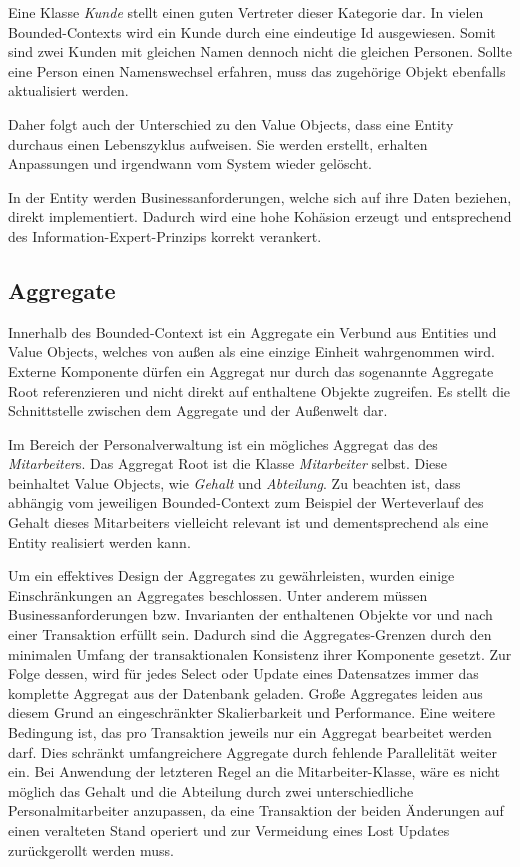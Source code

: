 Eine Klasse \emph{Kunde} stellt einen guten Vertreter dieser Kategorie dar. In vielen Bounded-Contexts wird ein Kunde durch eine eindeutige Id ausgewiesen. Somit sind zwei Kunden mit gleichen Namen dennoch nicht die gleichen Personen. Sollte eine Person einen Namenswechsel erfahren, muss das zugehörige Objekt ebenfalls aktualisiert werden.

Daher folgt auch der Unterschied zu den Value Objects, dass eine Entity durchaus einen Lebenszyklus aufweisen. Sie werden erstellt, erhalten Anpassungen und irgendwann vom System wieder gelöscht.

In der Entity werden Businessanforderungen, welche sich auf ihre Daten beziehen, direkt implementiert. Dadurch wird eine hohe Kohäsion erzeugt und entsprechend des Information-Expert-Prinzips korrekt verankert.


\subsection{Aggregate}

Innerhalb des Bounded-Context ist ein Aggregate ein Verbund aus Entities und Value Objects, welches von außen als eine einzige Einheit wahrgenommen wird. Externe Komponente dürfen ein Aggregat nur durch das sogenannte Aggregate Root referenzieren und nicht direkt auf enthaltene Objekte zugreifen. Es stellt die Schnittstelle zwischen dem Aggregate und der Außenwelt dar. 

Im Bereich der Personalverwaltung ist ein mögliches Aggregat das des \emph{Mitarbeiter}s. Das Aggregat Root ist die Klasse \emph{Mitarbeiter} selbst. Diese beinhaltet Value Objects, wie \emph{Gehalt} und \emph{Abteilung}. Zu beachten ist, dass abhängig vom jeweiligen Bounded-Context zum Beispiel der Werteverlauf des Gehalt dieses Mitarbeiters vielleicht relevant ist und dementsprechend als eine Entity realisiert werden kann.

Um ein effektives Design der Aggregates zu gewährleisten, wurden einige Einschränkungen an Aggregates beschlossen. Unter anderem müssen Businessanforderungen bzw. Invarianten der enthaltenen Objekte vor und nach einer Transaktion erfüllt sein. Dadurch sind die Aggregates-Grenzen durch den minimalen Umfang der transaktionalen Konsistenz ihrer Komponente gesetzt. Zur Folge dessen, wird für jedes Select oder Update eines Datensatzes immer das komplette Aggregat aus der Datenbank geladen. Große Aggregates leiden aus diesem Grund an eingeschränkter Skalierbarkeit und Performance. Eine weitere Bedingung ist, das pro Transaktion jeweils nur ein Aggregat bearbeitet werden darf. Dies schränkt umfangreichere Aggregate durch fehlende Parallelität weiter ein. Bei Anwendung der letzteren Regel an die Mitarbeiter-Klasse, wäre es nicht möglich das Gehalt und die Abteilung durch zwei unterschiedliche Personalmitarbeiter anzupassen, da eine Transaktion der beiden Änderungen auf einen veralteten Stand operiert und zur Vermeidung eines Lost Updates zurückgerollt werden muss. 

